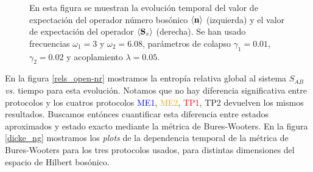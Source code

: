 \documentclass{report} %
\numberwithin{equation}{section}
\begin{document}
\begin{figure}
    \centering
    \qquad
    \caption{En esta figura se muestran la evolución temporal del valor de expectación del operador número bosónico $\langle {\bf n} \rangle $ (izquierda) y el valor de expectación del operador $\langle {\bf S}_z \rangle$ (derecha). Se han usado  frecuencias $\omega_1 = 3$ y $\omega_2 = 6.08$, parámetros de colapso $\gamma_1 = 0.01$, $\gamma_2 = 0.02$ y acoplamiento $\lambda = 0.05$.}
    \label{results_open-nr}
\end{figure}

En la figura \ref{rels_open-nr} mostramos la entropía relativa global al sistema $S_{AB}$ \textit{vs.} tiempo para esta evolución. Notamos que no hay diferencia significativa entre protocolos y los cuatros protocolos \textcolor{blue}{ME1}, \textcolor{orange}{ME2}, \textcolor{red}{TP1}, \textcolor{dark green}{TP2} devuelven los mismos resultados. Buscamos entónces cuantificar esta diferencia entre estados aproximados y estado exacto mediante la métrica de Bures-Wooters. En la figura \ref{dicke_ng} mostramos los \textit{plots} de la dependencia temporal de la métrica de Bures-Wooters para los tres protocolos usados, para distintas dimensiones del espacio de Hilbert bosónico.
\end{document}
